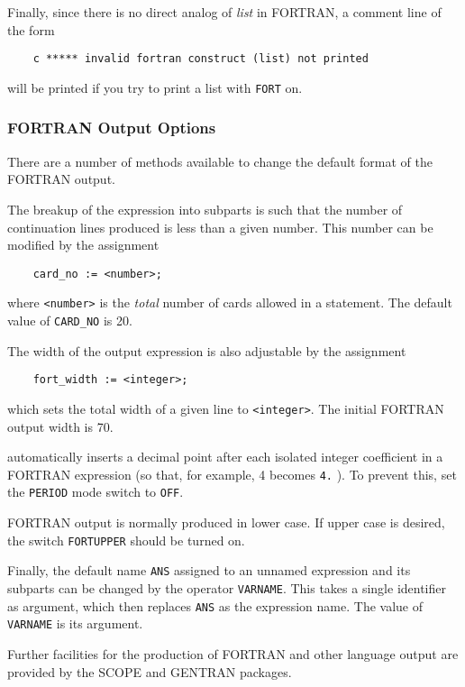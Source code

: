 Finally, since there is no direct analog of {\em list\/} in FORTRAN,
a comment line of the form
\begin{verbatim}
	c ***** invalid fortran construct (list) not printed
\end{verbatim}
will be printed if you try to print a list with {\tt FORT} on.

\subsubsection{{FORTRAN} Output Options}
\hypertarget{reserved:FORT_WIDTH}{}
\hypertarget{switch:PERIOD}{}
\hypertarget{switch:FORTUPPER}{}

There are a number of methods available to change the default format of the
FORTRAN output.

The breakup of the expression into subparts is such that the number of
continuation lines produced is less than a given number. This number can
be modified by the assignment
\begin{verbatim}
	card_no := <number>;
\end{verbatim}
where {\tt <number>} is the {\em total\/} number of cards allowed in a
statement. The default value of {\tt CARD\_NO} is 20.

The width of the output expression is also adjustable by the assignment
\begin{verbatim}
	fort_width := <integer>;
\end{verbatim}
 which sets the total width of a given line to
{\tt <integer>}.  The initial FORTRAN output width is 70.

{\REDUCE} automatically inserts a decimal point after each isolated integer
coefficient in a FORTRAN expression (so that, for example, 4 becomes
{\tt 4.} ). To prevent this, set the {\tt PERIOD}
mode switch to {\tt OFF}.

FORTRAN output is normally produced in lower case.  If upper case is desired,
the switch {\tt FORTUPPER} should be turned on.

\hypertarget{operator:VARNAME}{}
Finally, the default name {\tt ANS} assigned to an unnamed expression and
its subparts can be changed by the operator {\tt VARNAME}.
  This takes a single identifier as argument, which then
replaces {\tt ANS} as the expression name.  The value of {\tt VARNAME} is
its argument.

Further facilities for the production of FORTRAN and other language output
are provided by the SCOPE and GENTRAN
packages.

